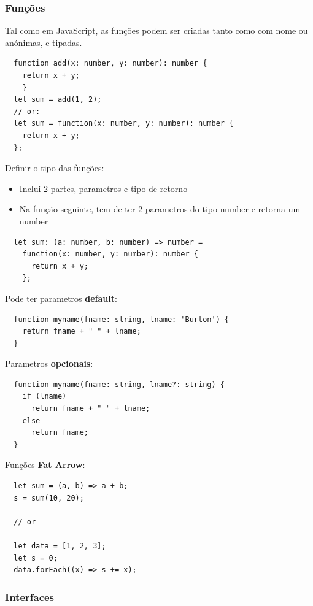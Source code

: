 \documentclass{article}
\begin{document}
\pagebreak

\subsubsection{Funções}

Tal como em JavaScript, as funções podem ser criadas tanto como
com nome ou anónimas, e tipadas.

\begin{lstlisting}
  function add(x: number, y: number): number {
    return x + y;
    }
  let sum = add(1, 2);
  // or:
  let sum = function(x: number, y: number): number {
    return x + y;
  };
\end{lstlisting}

Definir o tipo das funções:
\begin{itemize}
  \item Inclui 2 partes, parametros e tipo de retorno
  \item Na função seguinte, tem de ter 2 parametros do tipo number e retorna um number
\end{itemize}

\begin{lstlisting}
  let sum: (a: number, b: number) => number =
    function(x: number, y: number): number {
      return x + y;
    };
\end{lstlisting}

Pode ter parametros \textbf{default}:

\begin{lstlisting}
  function myname(fname: string, lname: 'Burton') {
    return fname + " " + lname;
  }
\end{lstlisting}

Parametros \textbf{opcionais}:

\begin{lstlisting}
  function myname(fname: string, lname?: string) {
    if (lname)
      return fname + " " + lname;
    else
      return fname;
  }
\end{lstlisting}

Funções \textbf{Fat Arrow}:

\begin{lstlisting}
  let sum = (a, b) => a + b;
  s = sum(10, 20);
  
  // or

  let data = [1, 2, 3];
  let s = 0;
  data.forEach((x) => s += x);
\end{lstlisting}

\pagebreak

\subsubsection{Interfaces}
\end{document}
